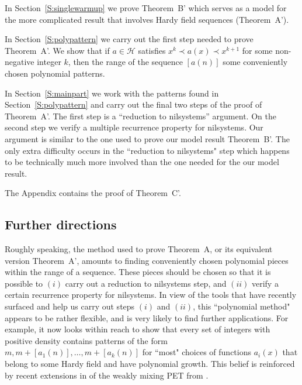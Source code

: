 \documentclass[11pt]{amsart}
\renewcommand{\H}{\mathcal{H}}
\theoremstyle{plain}
\theoremstyle{definition}
\theoremstyle{remark}
\begin{document}
In Section~\ref{S:singlewarmup} we prove Theorem~B' which serves as a
model for the more complicated result that involves Hardy field sequences (Theorem~A').

In Section~\ref{S:polypattern} we carry out the first step needed to
prove Theorem~A'. We show that if $a\in\H$ satisfies $x^k\prec a(x)
\prec x^{k+1}$ for some non-negative integer $k$, then the range of the
sequence $[a(n)]$ some conveniently chosen polynomial patterns.

In Section~\ref{S:mainpart} we work with the patterns found in
Section~\ref{S:polypattern} and  carry out the final two steps of
the proof of Theorem~A'. The first step is a  ``reduction to nilsystems'' argument.
On the second step we verify a multiple recurrence property for nilsystems. Our argument is similar
to the one used to prove our model result Theorem~B'. The only extra difficulty occurs
in the ``reduction to nilsystems" step which happens to be technically much more
involved than the one needed for the our model result.


The Appendix  contains the proof of Theorem~C'.

\subsection{Further directions}\label{SS:conjectures}
Roughly speaking, the method used to prove Theorem~A, or its equivalent version Theorem~A', amounts to finding
conveniently chosen polynomial pieces within the range of a sequence. These  pieces should be chosen
 so that it is possible to $(i)$ carry out
a reduction to nilsystems step, and $(ii)$ verify a certain recurrence property for nilsystems.
In view of the
 tools that have recently surfaced
 and help us
carry out steps $(i)$ and $(ii)$,
this ``polynomial method" appears to be rather flexible, and is very likely to find further applications.
For example, it  now  looks within reach  to show that every set of integers with positive density contains patterns of the form $m, m+[a_1(n)],\ldots,m+[a_k(n)]$ for ``most" choices of functions $a_i(x)$ that belong to some Hardy field and  have polynomial growth.
  This belief is reinforced by recent extensions in \cite{BH1} of the weakly mixing PET from \cite{Be2}.
\end{document}
